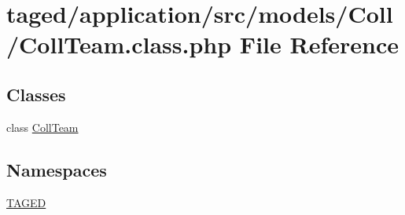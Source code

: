 \hypertarget{_coll_team_8class_8php}{}\section{taged/application/src/models/\+Coll/\+Coll\+Team.class.\+php File Reference}
\label{_coll_team_8class_8php}
\subsection*{Classes}
\begin{DoxyCompactItemize}
\item 
class \hyperlink{class_coll_team}{Coll\+Team}
\end{DoxyCompactItemize}
\subsection*{Namespaces}
\begin{DoxyCompactItemize}
\item 
 \hyperlink{namespace_t_a_g_e_d}{T\+A\+G\+ED}
\end{DoxyCompactItemize}
